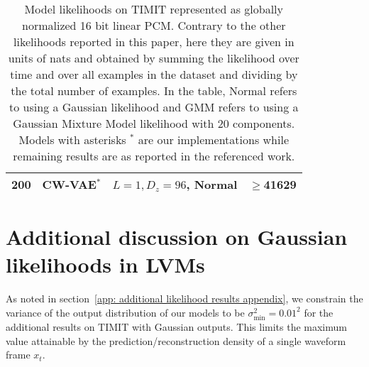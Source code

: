 {\begin{table}[t!]
\begin{tabular}{ll|lr}
        200 & CW-VAE$^*$                                         & $L=1, D_z=96$, Normal & $\geq$41629 \\  %
        \bottomrule
    \end{tabular}
    \vspace{2mm}
    \caption[Model likelihoods on TIMIT represented as globally normalized 16 bit linear PCM]{
    Model likelihoods on TIMIT represented as globally normalized 16 bit linear PCM. Contrary to the other likelihoods reported in this paper, here they are given in units of nats and obtained by summing the likelihood over time and over all examples in the dataset and dividing by the total number of examples. In the table, Normal refers to using a Gaussian likelihood and GMM refers to using a  Gaussian Mixture Model likelihood with 20 components. Models with asterisks $^*$ are our implementations while remaining results are as reported in the referenced work.
    }
    \label{tab: timit likelihoods gaussian appendix}
\end{table}


\section{Additional discussion on Gaussian likelihoods in LVMs} \label{app: gaussian likelihood unboundedness discussion}
As noted in section~\cref{app: additional likelihood results appendix}, we constrain the variance of the output distribution of our models to be $\sigma^2_\text{min} = 0.01^2$ for the additional results on TIMIT with Gaussian outputs. This limits the maximum value attainable by the prediction/reconstruction density of a single waveform frame $x_t$. 

}
